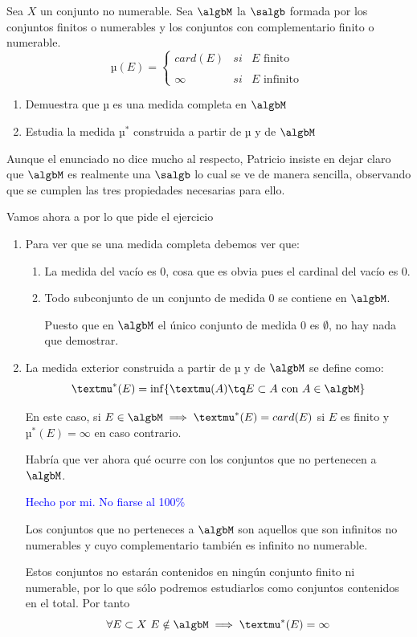 \begin{problem}[15]
Sea $X$ un conjunto no numerable. Sea $\algbM$ la $\salgb$ formada por los conjuntos finitos o numerables y los conjuntos con complementario finito o numerable.
\[µ(E)= \left\{ \begin{array}{lcc}
             card(E) &   si  & E \text{ finito } \\
            \\ \infty &  si  & E \text{ infinito }
             \end{array}
   \right.\]
\begin{enumerate}
\item Demuestra que µ es una medida completa en $\algbM$
\item Estudia la medida $µ^*$ construida a partir de µ y de $\algbM$
\end{enumerate}

\solution
Aunque el enunciado no dice mucho al respecto, Patricio insiste en dejar claro que  $\algbM$ es realmente una $\salgb$ lo cual se ve de manera sencilla, observando que se cumplen las tres propiedades necesarias para ello.

Vamos ahora a por lo que pide el ejercicio
\begin{enumerate}
\item Para ver que se una medida completa debemos ver que:
\begin{enumerate}
\item La medida del vacío es 0, cosa que es obvia pues el cardinal del vacío es 0.

\item Todo subconjunto de un conjunto de medida 0 se contiene en $\algbM$.

Puesto que en $\algbM$ el único conjunto de medida 0 es $\emptyset$, no hay nada que demostrar.
\end{enumerate}
\item La medida exterior construida a partir de µ y de $\algbM$ se define como:
\[µ ^*(E)=\inf\{µ(A) \tq E \subset A \text { con } A \in \algbM\}\]

En este caso, si $E\in\algbM \implies µ^*(E)=card(E)$ si $E$ es finito y $µ^*(E)=\infty$ en caso contrario.

Habría que ver ahora qué ocurre con los conjuntos que no pertenecen a  $\algbM$.

\textcolor{blue}{Hecho por mi. No fiarse al 100\%}

Los conjuntos que no perteneces a $\algbM$ son aquellos que son infinitos no numerables y cuyo complementario también es infinito no numerable.

Estos conjuntos no estarán contenidos en ningún conjunto finito ni numerable, por lo que sólo podremos estudiarlos como conjuntos contenidos en el total. Por tanto
\[\forall E \subset X \ E \notin \algbM \implies µ^*(E)=\infty\]
\end{enumerate}
\end{problem}


